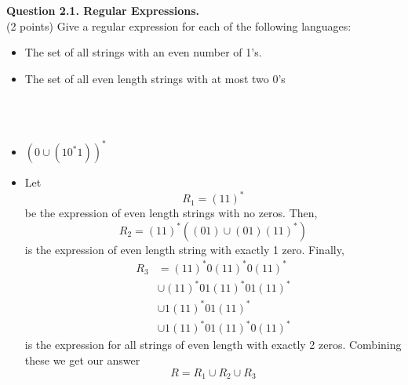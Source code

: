 \documentclass{article}
\newenvironment{question}[2]
{
    {\large \textbf{Question #1.}}\\
    #2\\\\
}{\newpage}
\begin{document}
\begin{question}
    {2.1. Regular Expressions}
    {(2 points) Give a regular expression for each of the following languages:
        \begin{itemize}
            \item The set of all strings with an even number of 1's.
            \item The set of all even length strings with at most two 0's
        \end{itemize}
        \ }
    \begin{itemize}
        \item $(0 \cup (10^*1))^*$
        \item Let \[R_1 = (11)^*\]
              be the expression of even length strings with no zeros. Then,
              \[R_2 = (11)^*((01)\cup(01)(11)^*)\]
              is the expression of even length string with exactly 1 zero.
              Finally,
              \begin{align*}
                  R_3 & =(11)^*0(11)^*0(11)^*       \\
                      & \cup (11)^*01(11)^*01(11)^* \\
                      & \cup 1(11)^*01(11)^*        \\
                      & \cup 1(11)^*01(11)^*0(11)^*
              \end{align*}
              is the expression for all strings of even length with exactly 2 zeros.
              Combining these we get our answer
              \[R = R_1 \cup R_2 \cup R_3\]
    \end{itemize}
\end{question}
\end{document}
